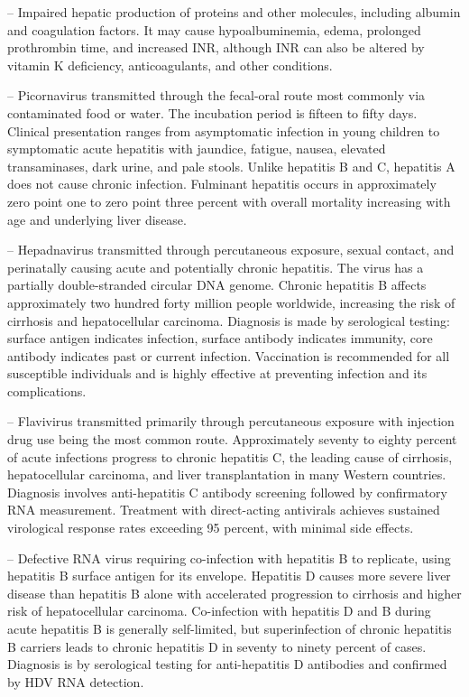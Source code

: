 -- Impaired hepatic production of proteins and other molecules, including albumin and coagulation factors. It may cause hypoalbuminemia, edema, prolonged prothrombin time, and increased INR, although INR can also be altered by vitamin K deficiency, anticoagulants, and other conditions.

-- Picornavirus transmitted through the fecal-oral route most commonly via contaminated food or water. The incubation period is fifteen to fifty days. Clinical presentation ranges from asymptomatic infection in young children to symptomatic acute hepatitis with jaundice, fatigue, nausea, elevated transaminases, dark urine, and pale stools. Unlike hepatitis B and C, hepatitis A does not cause chronic infection. Fulminant hepatitis occurs in approximately zero point one to zero point three percent with overall mortality increasing with age and underlying liver disease.

-- Hepadnavirus transmitted through percutaneous exposure, sexual contact, and perinatally causing acute and potentially chronic hepatitis. The virus has a partially double-stranded circular DNA genome. Chronic hepatitis B affects approximately two hundred forty million people worldwide, increasing the risk of cirrhosis and hepatocellular carcinoma. Diagnosis is made by serological testing: surface antigen indicates infection, surface antibody indicates immunity, core antibody indicates past or current infection. Vaccination is recommended for all susceptible individuals and is highly effective at preventing infection and its complications.

-- Flavivirus transmitted primarily through percutaneous exposure with injection drug use being the most common route. Approximately seventy to eighty percent of acute infections progress to chronic hepatitis C, the leading cause of cirrhosis, hepatocellular carcinoma, and liver transplantation in many Western countries. Diagnosis involves anti-hepatitis C antibody screening followed by confirmatory RNA measurement. Treatment with direct-acting antivirals achieves sustained virological response rates exceeding 95 percent, with minimal side effects.

-- Defective RNA virus requiring co-infection with hepatitis B to replicate, using hepatitis B surface antigen for its envelope. Hepatitis D causes more severe liver disease than hepatitis B alone with accelerated progression to cirrhosis and higher risk of hepatocellular carcinoma. Co-infection with hepatitis D and B during acute hepatitis B is generally self-limited, but superinfection of chronic hepatitis B carriers leads to chronic hepatitis D in seventy to ninety percent of cases. Diagnosis is by serological testing for anti-hepatitis D antibodies and confirmed by HDV RNA detection.

